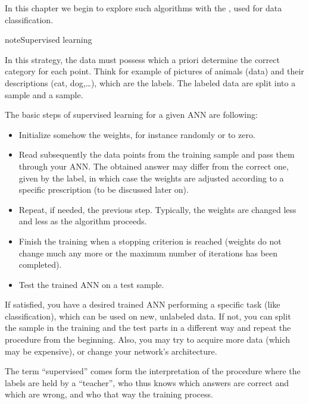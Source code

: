 \documentclass[letterpaper,10pt,english]{jupyterBook}
\begin{document}
\sphinxAtStartPar
In this chapter we begin to explore such algorithms with the , used for data classification.

\begin{sphinxadmonition}{note}{Supervised learning}

\sphinxAtStartPar
In this strategy, the data must possess  which a priori determine the correct category for each point. Think for example of pictures of animals (data) and their descriptions (cat, dog,…), which are the labels.
The labeled data are split into a  sample and a  sample.

\sphinxAtStartPar
The basic steps of supervised learning for a given ANN are following:
\begin{itemize}
\item {} 
\sphinxAtStartPar
Initialize somehow the weights, for instance randomly or to zero.

\item {} 
\sphinxAtStartPar
Read subsequently the data points from the training sample and pass them through your ANN. The obtained answer may differ from the correct one, given by the label, in which case the weights are adjusted according to a specific prescription (to be discussed later on).

\item {} 
\sphinxAtStartPar
Repeat, if needed, the previous step. Typically, the weights are changed less and less as the algorithm proceeds.

\item {} 
\sphinxAtStartPar
Finish the training when a stopping criterion is reached (weights do not change much any more or the maximum number of iterations has been completed).

\item {} 
\sphinxAtStartPar
Test the trained ANN on a test sample.

\end{itemize}

\sphinxAtStartPar
If satisfied, you have a desired trained ANN performing a specific task (like classification), which can be used on new, unlabeled data. If not, you can split the sample in the training and the test parts in a different way and repeat the procedure from the beginning. Also, you may try to acquire more data (which may be expensive), or change your network’s architecture.

\sphinxAtStartPar
The term “supervised” comes form the interpretation of the procedure where the labels are held by a “teacher”, who thus knows which answers are correct and which are wrong, and who  that way the training process.
\end{sphinxadmonition}
\end{document}
